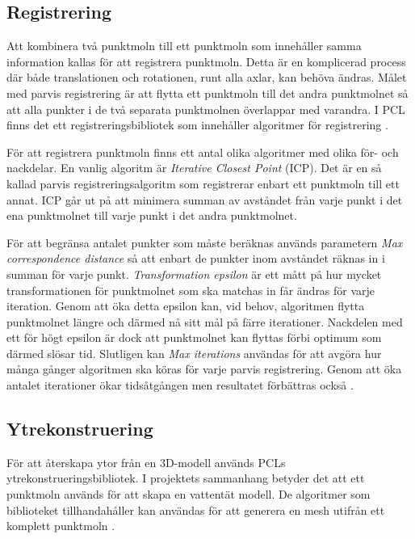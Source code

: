 \subsection{Registrering}
\label{sec:theory_registration}
Att kombinera två punktmoln till ett punktmoln som innehåller samma information kallas för att registrera punktmoln. Detta är en komplicerad process där både translationen och rotationen, runt alla axlar, kan behöva ändras. Målet med parvis registrering är att flytta ett punktmoln till det andra punktmolnet så att alla punkter i de två separata punktmolnen överlappar med varandra. I PCL finns det ett registreringsbibliotek som innehåller algoritmer för registrering \cite{pcl_registration}.

För att registrera punktmoln finns ett antal olika algoritmer med olika för- och nackdelar. En vanlig algoritm är \textit{Iterative Closest Point} (ICP). Det är en så kallad parvis registreringsalgoritm som registrerar enbart ett punktmoln till ett annat. ICP går ut på att minimera summan av avståndet från varje punkt i det ena punktmolnet till varje punkt i det andra punktmolnet.

För att begränsa antalet punkter som måste beräknas används parametern \textit{Max correspondence distance} så att enbart de punkter inom avståndet räknas in i summan för varje punkt. \textit{Transformation epsilon} är ett mått på hur mycket transformationen för punktmolnet som ska matchas in får ändras för varje iteration. Genom att öka detta epsilon kan, vid behov, algoritmen flytta punktmolnet längre och därmed nå sitt mål på färre iterationer. Nackdelen med ett för högt epsilon är dock att punktmolnet kan flyttas förbi optimum som därmed slösar tid. Slutligen kan \textit{Max iterations} användas för att avgöra hur många gånger algoritmen ska köras för varje parvis registrering. Genom att öka antalet iterationer ökar tidsåtgången men resultatet förbättras också \cite{pcl_icp_docs}.

\subsection{Ytrekonstruering}
För att återskapa ytor från en 3D-modell används PCLs ytrekonstrueringsbibliotek. I projektets sammanhang betyder det att ett punktmoln används för att skapa en vattentät modell. De algoritmer som biblioteket tillhandahåller kan användas för att generera en mesh utifrån ett komplett punktmoln \cite{pcl_surface_reconstruction}.  

